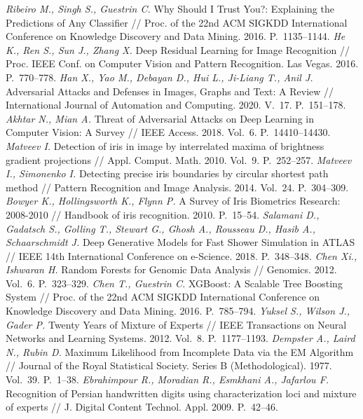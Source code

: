 \documentclass[12pt]{a&t}
\begin{document}
\begin{thebibliography}{}
	\textit{Ribeiro M., Singh S., Guestrin C.} Why Should I Trust You?: Explaining the Predictions of Any Classifier // Proc. of the 22nd ACM SIGKDD International Conference on Knowledge Discovery and Data Mining. 2016. P.~1135--1144.
	\textit{He K., Ren S., Sun J., Zhang X.} Deep Residual Learning for Image Recognition // Proc. IEEE Conf. on Computer Vision and Pattern Recognition. Las Vegas. 2016. P.~770--778.
	\textit{Han X., Yao M., Debayan D., Hui L., Ji-Liang T., Anil J.} Adversarial Attacks and Defenses in Images, Graphs and Text: A Review // International Journal of Automation and Computing. 2020. V.~17. P.~151--178.
	\textit{Akhtar N., Mian A.} Threat of Adversarial Attacks on Deep Learning in Computer Vision: A Survey // IEEE Access. 2018. Vol.~6. P.~14410--14430.
	\textit{Matveev I.} Detection of iris in image by interrelated maxima of brightness gradient projections // Appl. Comput. Math. 2010. Vol.~9. P.~252--257.
	\textit{Matveev I., Simonenko I.} Detecting precise iris boundaries by circular shortest path method // Pattern Recognition and Image Analysis. 2014. Vol.~24. P.~304--309.
	\textit{Bowyer K., Hollingsworth K., Flynn P.} A Survey of Iris Biometrics Research: 2008-2010 // Handbook of iris recognition. 2010. P.~15--54.
	\textit{Salamani D., Gadatsch S., Golling T.,  Stewart G., Ghosh A.,  Rousseau D.,  Hasib A.,  Schaarschmidt J.} Deep Generative Models for Fast Shower Simulation in ATLAS // IEEE 14th International Conference on e-Science. 2018. P.~348--348.
	\textit{Chen Xi., Ishwaran H.} Random Forests for Genomic Data Analysis // Genomics. 2012. Vol.~6. P.~323--329.
	\textit{Chen T., Guestrin C.} XGBoost: A Scalable Tree Boosting System // Proc. of the 22nd ACM SIGKDD International Conference on Knowledge Discovery and Data Mining. 2016. P.~785--794.
	\textit{Yuksel S., Wilson J., Gader P.} Twenty Years of Mixture of Experts // IEEE Transactions on Neural Networks and Learning Systems. 2012. Vol.~8. P.~1177--1193.
	\textit{Dempster A., Laird N., Rubin D.} Maximum Likelihood from Incomplete Data via the EM Algorithm // Journal of the Royal Statistical Society. Series B (Methodological). 1977. Vol.~39. P.~1--38.
	\textit{Ebrahimpour R., Moradian R., Esmkhani A., Jafarlou F.} Recognition of Persian handwritten digits using characterization loci and mixture of experts // J. Digital Content Technol. Appl. 2009. P.~42--46.

\end{thebibliography}
\end{document}
